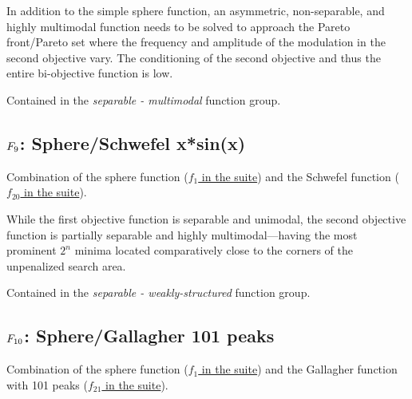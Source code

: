 In addition to the simple sphere function, an asymmetric, non-separable,
and highly multimodal function needs to be solved to approach the Pareto
front/Pareto set where the frequency and amplitude of the modulation
in the second objective vary. The conditioning of the second objective
and thus the entire bi-objective function is low.

Contained in the \emph{separable - multimodal} function group.



\subsection[\texorpdfstring{\protect\(F_9\protect\): Sphere/Schwefel x*sin(x)}{F9: Sphere/Schwefel x*sin(x)}]{\texorpdfstring{\protect\(F_9\protect\): Sphere/Schwefel x*sin(x)}{}}
\label{index:f9}\label{index:sphere-schwefel-x-sin-x}
Combination of the sphere function (\href{https://coco.gforge.inria.fr/downloads/download16.00/bbobdocfunctions.pdf\#page=5}{\(f_1\) in the \bbob suite})
and the Schwefel function (\href{https://coco.gforge.inria.fr/downloads/download16.00/bbobdocfunctions.pdf\#page=100}{\(f_{20}\) in the \bbob suite}).

While the first objective function is separable and unimodal,
the second objective function is partially separable and highly
multimodal---having the most prominent \(2^n\) minima located
comparatively close to the corners of the unpenalized search area.

Contained in the \emph{separable - weakly-structured} function group.



\subsection[\texorpdfstring{\protect\(F_{10}\protect\): Sphere/Gallagher 101 peaks}{F10: Sphere/Gallagher 101 peaks}]{\texorpdfstring{\protect\(F_{10}\protect\): Sphere/Gallagher 101 peaks}{}}
\label{index:f10}\label{index:sphere-gallagher-101-peaks}
Combination of the sphere function (\href{https://coco.gforge.inria.fr/downloads/download16.00/bbobdocfunctions.pdf\#page=5}{\(f_1\) in the \bbob suite})
and the Gallagher function with 101 peaks (\href{https://coco.gforge.inria.fr/downloads/download16.00/bbobdocfunctions.pdf\#page=105}{\(f_{21}\) in the \bbob suite}).

